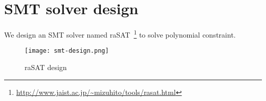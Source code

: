 \chapter{SMT solver design}
We design an SMT solver named raSAT~\footnote{\url{http://www.jaist.ac.jp/~mizuhito/tools/rasat.html}} to solve polynomial constraint. 


\begin{figure}[ht]
\centering
\texttt{[image: smt-design.png]} 
\caption{raSAT design} 
\label{fig:smt-design} 
\end{figure} 